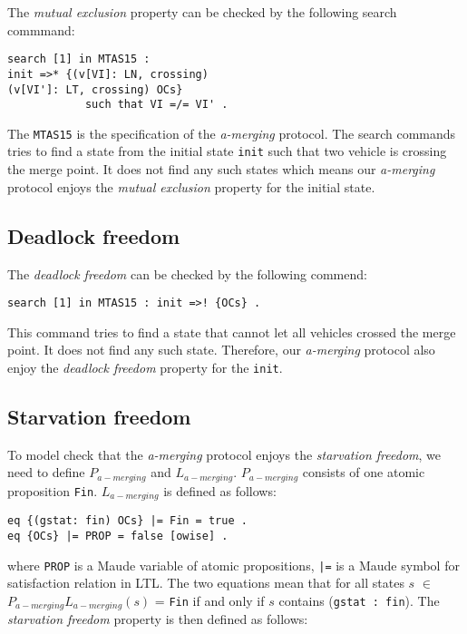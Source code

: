 \documentclass[10pt, conference, compsocconf]{IEEEtran}
\begin{document}
The \textit{mutual exclusion} property can be checked by the following search commmand:

\begin{small}
\begin{verbatim}
search [1] in MTAS15 : 
init =>* {(v[VI]: LN, crossing) 
(v[VI']: LT, crossing) OCs} 
            such that VI =/= VI' .
\end{verbatim}
\end{small}

The \verb!MTAS15! is the specification of the \textit{a-merging} protocol.
The search commands tries to find a state from the initial state \verb!init! such that two vehicle is crossing the merge point.
It does not find any such states which means our \textit{a-merging} protocol enjoys the \textit{mutual exclusion} property for the initial state.


\subsection{Deadlock freedom}
The \textit{deadlock freedom} can be checked by the following commend:

\begin{small}
\begin{verbatim}
search [1] in MTAS15 : init =>! {OCs} .
\end{verbatim}
\end{small}

This command tries to find a state that cannot let all vehicles crossed the merge point. 
It does not find any such state.
Therefore, our \textit{a-merging} protocol also enjoy the \textit{deadlock freedom} property for the \verb!init!.


\subsection{Starvation freedom}
To model check that the \textit{a-merging} protocol enjoys the \textit{starvation freedom}, we need to define $P_{a-merging}$ and $L_{a-merging}$. 
$P_{a-merging}$ consists of one atomic proposition \verb!Fin!.
$L_{a-merging}$ is defined as follows:

\begin{small}
\begin{verbatim}
eq {(gstat: fin) OCs} |= Fin = true .
eq {OCs} |= PROP = false [owise] .
\end{verbatim}
\end{small}

where \verb!PROP! is a Maude variable of atomic propositions, \verb!|=! is a Maude symbol for satisfaction relation in LTL. 
The two equations mean that for all states $s$ $\in$ $P_{a-merging}L_{a-merging}(s)$ = {\verb!Fin!} if and only if $s$ contains (\verb!gstat : fin!). 
The \textit{starvation freedom} property is then defined as follows:
\end{document}
